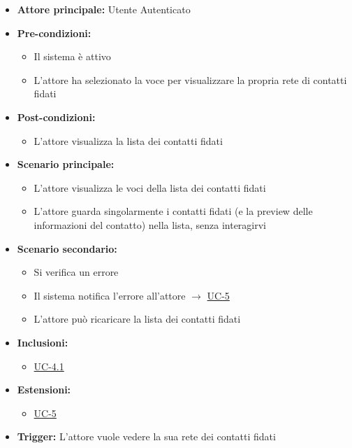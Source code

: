 \documentclass[a4paper,12pt]{article}
\newcommand{\ignoreglossary}{}
\begin{document}
\begin{itemize}
    \item \textbf{Attore principale:} Utente Autenticato
    \item \textbf{Pre-condizioni:}
    \begin{itemize}
        \item Il sistema è attivo
        \item L'attore ha selezionato la voce per visualizzare la propria rete di contatti fidati
    \end{itemize}
    \item \textbf{Post-condizioni:} 
    \begin{itemize}
        \item L'attore visualizza la lista dei contatti fidati
    \end{itemize}
    \item \textbf{Scenario principale:} 
    \begin{itemize}
        \item L'attore visualizza le voci della lista dei contatti fidati
        \item L'attore guarda singolarmente i contatti fidati (e la preview delle informazioni del contatto) nella lista, senza interagirvi
    \end{itemize}
    \item \textbf{Scenario secondario:} 
    \begin{itemize}
        \item Si \ignoreglossary{verifica} un errore
        \item Il sistema notifica l'errore all'attore $\rightarrow$ \hyperref[sec:UC-5]{UC-5}
        \item L'attore può ricaricare la lista dei contatti fidati
    \end{itemize}
    \item \textbf{Inclusioni:} 
    \begin{itemize}
        \item \hyperref[subsec:UC-4.1]{UC-4.1}
    \end{itemize}
    \item \textbf{Estensioni:} 
    \begin{itemize}
        \item \hyperref[sec:UC-5]{UC-5}
    \end{itemize}
    \item \textbf{Trigger:} L'attore vuole vedere la sua rete dei contatti fidati
\end{itemize}
\end{document}
